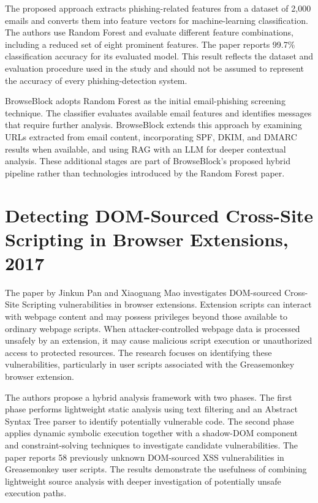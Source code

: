 The proposed approach extracts phishing-related features from a dataset of 2,000
emails and converts them into feature vectors for machine-learning classification.
The authors use Random Forest and evaluate different feature combinations,
including a reduced set of eight prominent features. The paper reports 99.7\%
classification accuracy for its evaluated model. This result reflects the dataset
and evaluation procedure used in the study and should not be assumed to represent
the accuracy of every phishing-detection system.

BrowseBlock adopts Random Forest as the initial email-phishing screening technique.
The classifier evaluates available email features and identifies messages that
require further analysis. BrowseBlock extends this approach by examining URLs
extracted from email content, incorporating SPF, DKIM, and DMARC results when
available, and using RAG with an LLM for deeper contextual analysis. These
additional stages are part of BrowseBlock's proposed hybrid pipeline rather than
technologies introduced by the Random Forest paper.

\clearpage
\section{Detecting DOM-Sourced Cross-Site Scripting in Browser Extensions, 2017}
The paper by Jinkun Pan and Xiaoguang Mao investigates DOM-sourced Cross-Site
Scripting vulnerabilities in browser extensions. Extension scripts can interact
with webpage content and may possess privileges beyond those available to ordinary
webpage scripts. When attacker-controlled webpage data is processed unsafely by
an extension, it may cause malicious script execution or unauthorized access to
protected resources. The research focuses on identifying these vulnerabilities,
particularly in user scripts associated with the Greasemonkey browser extension.

The authors propose a hybrid analysis framework with two phases. The first phase
performs lightweight static analysis using text filtering and an Abstract Syntax
Tree parser to identify potentially vulnerable code. The second phase applies
dynamic symbolic execution together with a shadow-DOM component and
constraint-solving techniques to investigate candidate vulnerabilities. The paper
reports 58 previously unknown DOM-sourced XSS vulnerabilities in Greasemonkey
user scripts. The results demonstrate the usefulness of combining lightweight
source analysis with deeper investigation of potentially unsafe execution paths.

